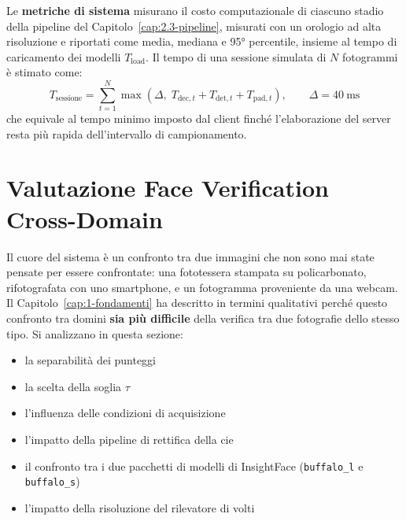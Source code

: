 Le \textbf{metriche di sistema} misurano il costo computazionale di ciascuno stadio della pipeline del Capitolo~\ref{cap:2.3-pipeline}, misurati con un orologio ad alta risoluzione e riportati come media, mediana e 95° percentile, insieme al tempo di caricamento dei modelli $T_{\text{load}}$.
Il tempo di una sessione simulata di $N$ fotogrammi è stimato come:
\begin{equation}
    \label{eq:tempoSessioneSimulato}
    T_{\text{sessione}} = \sum_{t=1}^{N} \max\left(\Delta, \; T_{\text{dec}, t} + T_{\text{det}, t} + T_{\text{pad}, t}\right), \qquad \Delta = 40~\text{ms}
\end{equation}
che equivale al tempo minimo imposto dal client finché l'elaborazione del server resta più rapida dell'intervallo di campionamento.


\section{Valutazione Face Verification Cross-Domain}\label{cap:4.2-verifica}
Il cuore del sistema è un confronto tra due immagini che non sono mai state pensate per essere confrontate: una fototessera stampata su policarbonato, rifotografata con uno smartphone, e un fotogramma proveniente da una webcam.
Il Capitolo~\ref{cap:1-fondamenti} ha descritto in termini qualitativi perché questo confronto tra domini \textbf{sia più difficile} della verifica tra due fotografie dello stesso tipo.
Si analizzano in questa sezione:
\begin{itemize}
    \item la separabilità dei punteggi
    \item la scelta della soglia $\tau$
    \item l'influenza delle condizioni di acquisizione
    \item l'impatto della pipeline di rettifica della \gls{cie}
    \item il confronto tra i due pacchetti di modelli di InsightFace (\texttt{buffalo\_l} e \texttt{buffalo\_s})
    \item l'impatto della risoluzione del rilevatore di volti
\end{itemize}

